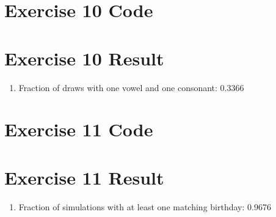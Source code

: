 \documentclass[11pt]{article}
\begin{document}
\pagebreak

\section*{Exercise 10 Code}


\section*{Exercise 10 Result}
\begin{enumerate}[label=(\alph*)]
\item Fraction of draws with one vowel and one consonant: 0.3366
\end{enumerate}

\pagebreak

\section*{Exercise 11 Code}


\section*{Exercise 11 Result}
\begin{enumerate}[label=(\alph*)]
\item Fraction of simulations with at least one matching birthday: 0.9676
\end{enumerate}
\end{document}

